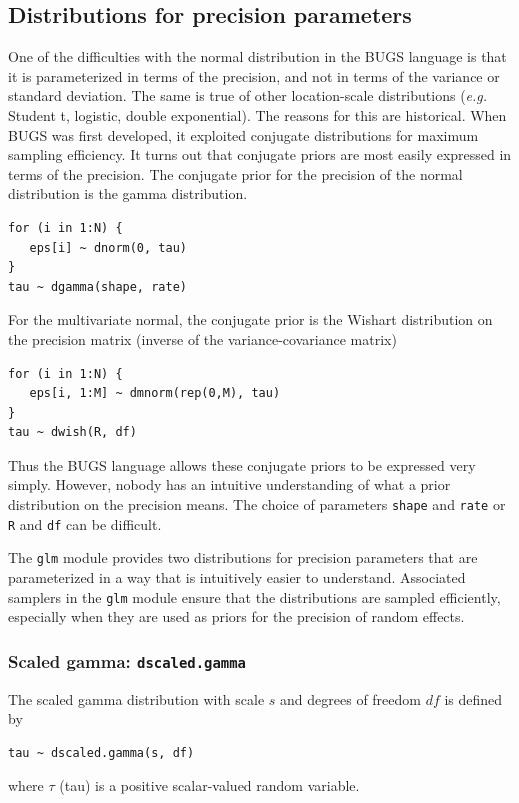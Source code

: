 \documentclass[11pt, a4paper, titlepage]{report}
\begin{document}
\subsection{Distributions for precision parameters}

One of the difficulties with the normal distribution in the BUGS
language is that it is parameterized in terms of the precision, and not
in terms of the variance or standard deviation. The same is true of
other location-scale distributions ({\em e.g.} Student t, logistic,
double exponential). The reasons for this are historical. When BUGS
was first developed, it exploited conjugate distributions for maximum
sampling efficiency. It turns out that conjugate priors are most
easily expressed in terms of the precision. The conjugate prior for
the precision of the normal distribution is the gamma distribution.
\begin{verbatim}
for (i in 1:N) {
   eps[i] ~ dnorm(0, tau)
}
tau ~ dgamma(shape, rate)
\end{verbatim}
For the multivariate normal, the conjugate prior is the Wishart
distribution on the precision matrix (inverse of the
variance-covariance matrix)
\begin{verbatim}
for (i in 1:N) {
   eps[i, 1:M] ~ dmnorm(rep(0,M), tau)
}
tau ~ dwish(R, df)
\end{verbatim}
Thus the BUGS language allows these conjugate priors to be expressed
very simply. However, nobody has an intuitive understanding of what a
prior distribution on the precision means. The choice of parameters
\texttt{shape} and \texttt{rate} or \texttt{R} and \texttt{df} can be
difficult.

The \texttt{glm} module provides two distributions for precision
parameters that are parameterized in a way that is intuitively easier
to understand. Associated samplers in the \texttt{glm} module ensure
that the distributions are sampled efficiently, especially when they
are used as priors for the precision of random effects.

\subsubsection{Scaled gamma: \texttt{dscaled.gamma}}

The scaled gamma distribution with scale $s$ and degrees of freedom $df$
is defined by
\begin{verbatim}
tau ~ dscaled.gamma(s, df)
\end{verbatim}
where $\tau$ (tau) is a positive scalar-valued random variable.
\end{document}
